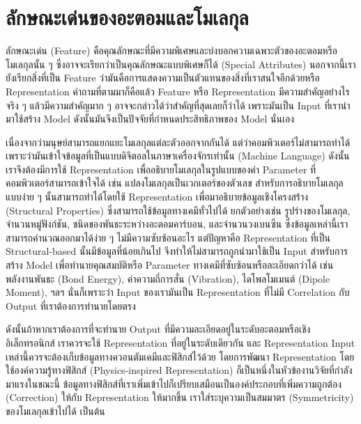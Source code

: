 

\chapter{ลักษณะเด่นของอะตอมและโมเลกุล}
\label{ch:feature}

ลักษณะเด่น (Feature) คือคุณลักษณะที่มีความพิเศษและบ่งบอกความเฉพาะตัวของอะตอมหรือโมเลกุลนั้น ๆ ซึ่งอาจจะเรียกว่าเป็นคุณลักษณะแบบพิเศษก็ได้ 
(Special Attributes) นอกจากนี้เรายังเรียกสิ่งที่เป็น Feature ว่ามันคือการแสดงความเป็นตัวแทนของสิ่งที่เราสนใจอีกด้วยหรือ Representation
คำถามที่ตามมาก็คือแล้ว Feature หรือ Representation มีความสำคัญอย่างไร จริง ๆ แล้วมีความสำคัญมาก ๆ อาจจะกล่าวได้ว่าสำคัญที่สุดเลยก็ว่าได้ 
เพราะมันเป็น Input ที่เรานำมาใช้สร้าง Model ดังนั้นมันจึงเป็นปัจจัยที่กำหนดประสิทธิภาพของ Model นั่นเอง 

เนื่องจากว่ามนุษย์สามารถแยกแยะโมเลกุลแต่ละตัวออกจากกันได้ แต่ว่าคอมพิวเตอร์ไม่สามารถทำได้ เพราะว่ามันเข้าใจข้อมูลที่เป็นแบบดิจิตอลในภาษาเครื่องจักรเท่านั้น (Machine Language)
ดังนั้นเราจึงต้องมีการใช้ Representation เพื่ออธิบายโมเลกุลในรูปแบบของค่า Parameter ที่คอมพิวเตอร์สามารถเข้าใจได้ เช่น แปลงโมเลกุลเป็นเวกเตอร์ของตัวเลข 
สำหรับการอธิบายโมเลกุลแบบง่าย ๆ นั้นสามารถทำได้โดยใช้ Representation เพื่อมาอธิบายข้อมูลเชิงโครงสร้าง (Structural Properties) 
ซึ่งสามารถใช้ข้อมูลทางเคมีทั่วไปได้ ยกตัวอย่างเช่น รูปร่างของโมเลกุล, จำนวนหมู่ฟังก์ชัน, ชนิดของพันธะระหว่างอะตอมคาร์บอน, และจำนวนวงเบนซีน 
ซึ่งข้อมูลเหล่านี้เราสามารถคำนวณออกมาได้ง่าย ๆ ไม่มีความซับซ้อนอะไร แต่ปัญหาคือ Representation ที่เป็น Structural-based นั้นมีข้อมูลที่น้อยเกินไป
จึงทำให้ไม่สามารถถูกนำมาใช้เป็น Input สำหรับการสร้าง Model เพื่อทำนายคุณสมบัติหรือ Parameter ทางเคมีที่ซับซ้อนหรือละเอียดกว่าได้ เช่น 
พลังงานพันธะ (Bond Energy), ค่าความถี่การสั่น (Vibration), ไดโพลโมเมนต์ (Dipole Moment), ฯลฯ 
นั่นก็เพราะว่า Input ของเรามันเป็น Representation ที่ไม่มี Correlation กับ Output ที่เราต้องการทำนายโดยตรง

ดังนั้นถ้าหากเราต้องการที่จะทำนาย Output ที่มีความละเอียดอยู่ในระดับอะตอมหรือเชิงอิเล็กทรอนิกส์ เราควรจะใช้ Representation ที่อยู่ในระดับเดียวกัน 
และ Representation Input เหล่านี้ควรจะต้องเก็บข้อมูลทางควอนตัมเคมีและฟิสิกส์ไว้ด้วย โดยการพัฒนา Representation โดยใช้องค์ความรู้ทางฟิสิกส์
(Physics-inspired Representation) ก็เป็นหนึ่งในหัวข้องานวิจัยที่กำลังมาแรงในขณะนี้ ข้อมูลทางฟิสิกส์ที่เราเพิ่มเข้าไปก็เปรียบเสมือนเป็นองค์ประกอบที่เพิ่มความถูกต้อง
(Correction) ให้กับ Representation ให้มากขึ้น เราใส่ระบุความเป็นสมมาตร (Symmetricity) ของโมเลกุลเข้าไปได้ เป็นต้น 

